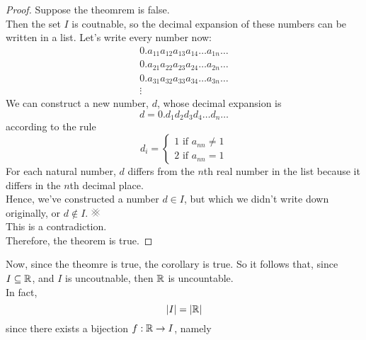 \documentclass{report}
\begin{document}
\begin{proof}
	Suppose the theomrem is false. \\
	Then the set $I$ is coutnable, so the decimal expansion of these numbers can be written in a list. Let's write every number now:
	$$
		\begin{array}{l}
			0.a_{11}a_{12}a_{13}a_{14}\dots a_{1n} \dots \\
			0.a_{21}a_{22}a_{23}a_{24}\dots a_{2n} \dots \\
			0.a_{31}a_{32}a_{33}a_{34}\dots a_{3n} \dots \\
			\vdots
		\end{array}
	$$
	We can construct a new number, $d$, whose decimal expansion is 
	$$
		d = 0.d_1d_2d_3d_4\dots d_n \dots
	$$
	according to the rule
	$$
		d_i = \left\lbrace \begin{array}{l} 1 \text{ if } a_{nn} \neq 1 \\ 2 \text{ if } a_{nn} = 1			
		\end{array} \right.
	$$
	For each natural number, $d$ differs from the $n$th real number in the list because it differs in the $n$th decimal place. \\
	Hence, we've constructed a number $d\in I$, but which we didn't write down originally, or $d\notin I$. $\CONTRA$ \\
	This is a contradiction. \\
	Therefore, the theorem is true.
\end{proof}
Now, since the theomre is true, the corollary is true. So it follows that, since $I\subseteq\mathbb{R}$, and $I$ is uncoutnable, then $\mathbb{R}$ is uncountable. \\

In fact, 
$$
	\left| I \right| = \left| \mathbb{R} \right|
$$
since there exists a bijection $f: \mathbb{R} \to I$, namely
\begin{center}
\end{center}
\end{document}
